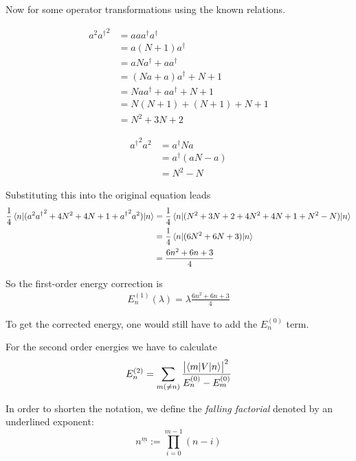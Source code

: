 \documentclass[a4paper,german,12pt,smallheadings]{scrartcl}
\begin{document}
\begin{enumerate}[a)]
    Now for some operator transformations using the known relations.

    \begin{align*}
      a^2{a^\dagger}^2 &= aaa^\dagger a^\dagger \\
                       &= a(N+1)a^\dagger \\
                       &= aNa^\dagger + aa^\dagger \\
                       &= (Na + a)a^\dagger + N + 1 \\
                       &= Naa^\dagger + aa^\dagger + N + 1 \\
                       &= N(N+1) + (N+1) + N + 1 \\
                       &= N^2 + 3N + 2
    \end{align*}

    \begin{align*}
      {a^\dagger}^2 a^2 &= a^\dagger N a \\
                        &= a^\dagger (aN - a) \\
                        &= N^2 - N
    \end{align*}

    Substituting this into the original equation leads
    \begin{align*}
      \frac{1}{4} \braket{n|(a^2{a^\dagger}^2 + 4 N^2 + 4N + 1 + {a^\dagger}^2a^2)|n} 
      &= \frac{1}{4} \braket{n|(N^2 + 3N + 2 + 4N^2 + 4N + 1 + N^2 - N)|n} \\
      &= \frac{1}{4} \braket{n|(6N^2 + 6N + 3)|n} \\
      &= \frac{6n^2 + 6n +3}{4}
    \end{align*}

    So the first-order energy correction is
    \begin{align*}
      E_n^{(1)}(\lambda) = \lambda \frac{6n^2 + 6n + 3}{4}
    \end{align*}

    To get the corrected energy, one would still have to add the $E_n^{(0)}$
    term.

    For the second order energies we have to calculate
    \begin{align*}
      E_n^{(2)} = \sum_{m (\neq n)} \frac{\envert{\braket{m|V|n}}^2}{E^{(0)}_n - E^{(0)}_m}
    \end{align*}

    In order to shorten the notation, we define the \textit{falling factorial}
    denoted by an underlined exponent:
    \begin{equation*}
      n^{\underline{m}} := \prod_{i=0}^{m-1} (n-i)
    \end{equation*}


\end{enumerate}
\end{document}
